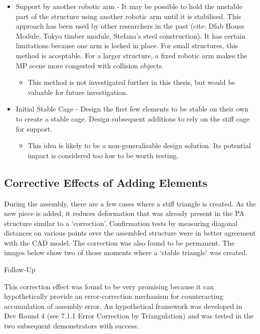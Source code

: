 \begin{itemize}
\begin{itemize}
    \end{itemize}
\item Support by another robotic arm - It may be possible to hold the unstable part of the structure using another robotic arm until it is stabilised. This approach has been used by other researchers in the past (cite: Dfab House Module, Tokyo timber module, Stefana’s steel construction). It has certain limitations because one arm is locked in place. For small structures, this method is acceptable. For a larger structure, a fixed robotic arm makes the MP scene more congested with collision objects.
\begin{itemize}
    \item This method is not investigated further in this thesis, but would be valuable for future investigation.
\end{itemize}
\item Initial Stable Cage - Design the first few elements to be stable on their own to create a stable cage. Design subsequent additions to rely on the stiff cage for support.
\begin{itemize}
    \item This idea is likely to be a non-generalisable design solution. Its potential impact is considered too low to be worth testing.
    \end{itemize}
\end{itemize}

\subsection{Corrective Effects of Adding Elements}
During the assembly, there are a few cases where a stiff triangle is created. As the new piece is added, it reduces deformation that was already present in the PA structure similar to a ‘correction’. Confirmation tests by measuring diagonal distances on various points over the assembled structure were in better agreement with the CAD model. The correction was also found to be permanent. The images below show two of those moments where a ‘stable triangle’ was created.

Follow-Up

This correction effect was found to be very promising because it can hypothetically provide an error-correction mechanism for counteracting accumulation of assembly error. An hypothetical framework was developed in Dev Round 4  (see 7.1.1 Error Correction by Triangulation) and was tested in the two subsequent demonstrators with success.

